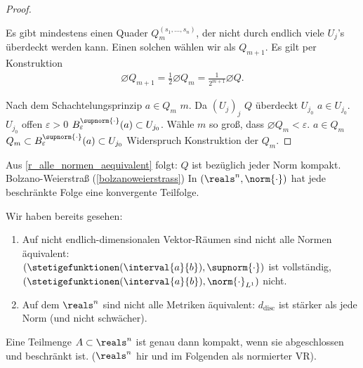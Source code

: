 \begin{proof}
\begin{figure}[H]
        \label{fig:teilquader}
    \end{figure}
    Es gibt mindestens einen Quader \( Q_m^{(s_1,\dotsc,s_n)} \), der nicht durch endlich viele \( U_j \)'s überdeckt werden kann. Einen solchen wählen wir als \( Q_{m+1} \). Es gilt per Konstruktion
    \begin{align*}
        \diameter{Q_{m+1}}=\frac{1}{2}\diameter{Q_m}=\frac{1}{2^{m+1}}\diameter{Q}.
    \end{align*}
    
    Nach dem Schachtelungsprinzip \texists \( a\in Q_m \) \tforall \( m \). Da \( (U_j)_j \) \( Q \) überdeckt \texists \( U_{j_0} \) \sd \( a\in U_{j_0} \). \( U_{j_0} \) offen \timplies \texists \( \varepsilon>0 \) \sd \( B_{\varepsilon}^{\supnorm{\cdot}}(a)\subset U_{j_0} \). Wähle \( m \) so groß, dass \( \diameter{Q_m}<\varepsilon \). \( a\in Q_m \) \timplies \( Q_m\subset B_{\varepsilon}^{\supnorm{\cdot}}(a)\subset U_{j_0} \) \contra Widerspruch Konstruktion der \( Q_m \).
\end{proof}
\begin{bemerkung}
    Aus \ref{r_alle_normen_aequivalent} folgt: \( Q \) ist bezüglich jeder Norm kompakt. Bolzano-Weierstraß (\ref{bolzanoweierstrass}) \timplies In \( (\reals^n,\norm{\cdot}) \) hat jede beschränkte Folge eine konvergente Teilfolge.
\end{bemerkung}
\begin{bemerkungen}
    Wir haben bereits gesehen:
    \begin{enumerate}
        \item Auf nicht endlich-dimensionalen Vektor-Räumen sind nicht alle Normen äquivalent:\\
        \( (\stetigefunktionen(\interval{a}{b}), \supnorm{\cdot}) \) ist vollständig, \( (\stetigefunktionen(\interval{a}{b}), \norm{\cdot}_{L^1}) \) nicht.
        \item Auf dem \( \reals^n \) sind nicht alle Metriken äquivalent: \( d_{\text{disc}} \) ist stärker als jede Norm (und nicht schwächer).
    \end{enumerate}
\end{bemerkungen}
\begin{satz}\label{heineborel}
    Eine Teilmenge \( A\subset \reals^n \) ist genau dann kompakt, wenn sie abgeschlossen und beschränkt ist. (\( \reals^n \) hir und im Folgenden als normierter VR). 
\end{satz}
